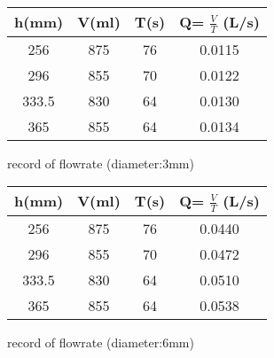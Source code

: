 \begin{minipage}{\textwidth}

    \begin{minipage}[t]{0.5\textwidth}
        \centering
    \makeatletter{}
    \begin{tabular}{cccc}
        \toprule
        h(mm)                       & V(ml)                    & T(s)&Q= $\frac{V}{T}$ (L/s)  \\
        \midrule
        256                     & 875                  & 76 &0.0115    \\
        296                     & 855                  & 70 &0.0122    \\
        333.5                   & 830                  & 64 &0.0130    \\
        365                     & 855                  & 64 &0.0134    \\
        \bottomrule
    \end{tabular}
    \caption{record of flowrate (diameter:3mm)}
    \end{minipage}
    \begin{minipage}[t]{0.5\textwidth}
        \centering
    \makeatletter{}
    \begin{tabular}{cccc}
        \toprule
        h(mm)                       & V(ml)                    & T(s)&Q= $\frac{V}{T}$ (L/s)  \\
        \midrule
        256                     & 875                  & 76  &0.0440   \\
        296                     & 855                  & 70  &0.0472   \\
        333.5                   & 830                  & 64  &0.0510   \\
        365                     & 855                  & 64  &0.0538   \\
        \bottomrule
    \end{tabular}
    \caption{record of flowrate (diameter:6mm)}
    \end{minipage}
    \end{minipage}
    

\FloatBarrier %



